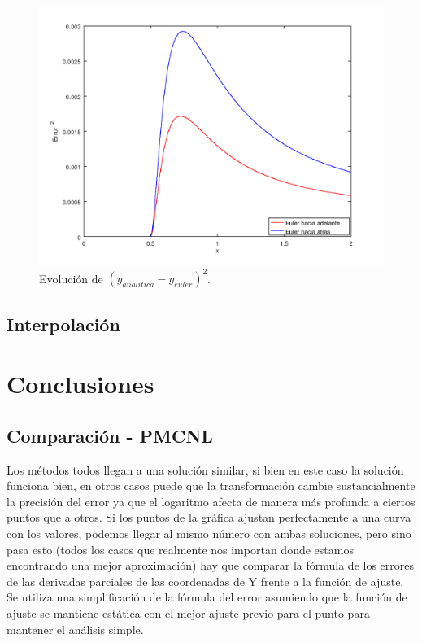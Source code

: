 \documentclass{endm}
\begin{document}
\begin{figure}
    \includegraphics[width=\linewidth]{error_euler.png}
    \caption{Evolución de $(y_{analitica} - y_{euler})^2$.}
    \label{fig:error_euler}
\end{figure}


\subsection{Interpolación}



\clearpage
\section{Conclusiones}\label{Conclusiones}

\subsection{Comparación - PMCNL}
Los métodos todos llegan a una solución similar, si bien en este caso la solución funciona bien, en otros casos puede que la transformación cambie sustancialmente la precisión del error ya que el logaritmo afecta de manera más profunda a ciertos puntos que a otros. Si los puntos de la gráfica ajustan perfectamente a una curva con los valores, podemos llegar al mismo número con ambas soluciones, pero sino pasa esto (todos los casos que realmente nos importan donde estamos encontrando una mejor aproximación) hay que comparar la fórmula de los errores de las derivadas parciales de las coordenadas de Y frente a la función de ajuste. Se utiliza una simplificación de la fórmula del error asumiendo que la función de ajuste se mantiene estática con el mejor ajuste previo para el punto para mantener el análisis simple.
\end{document}
